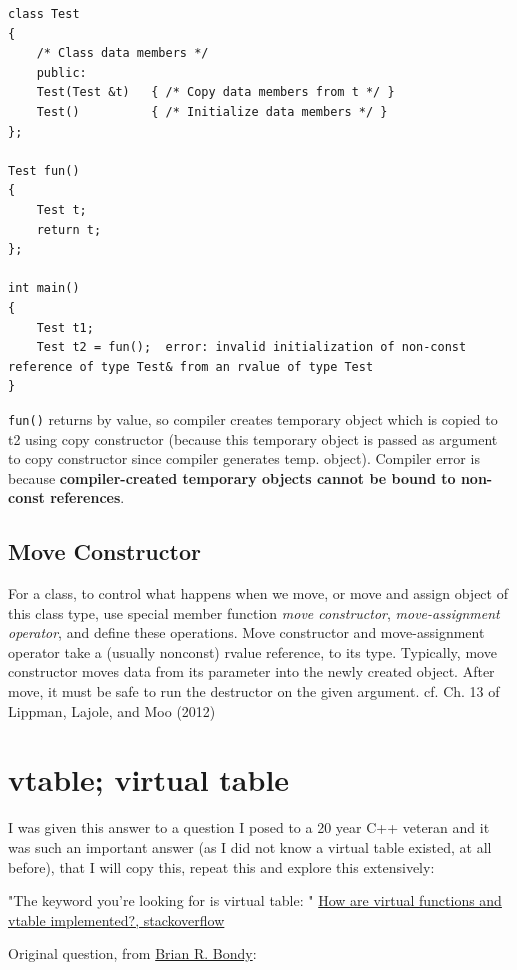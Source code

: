 \documentclass[10pt]{amsart}
\begin{document}
\begin{multicols*}{2}
\begin{lstlisting}
class Test
{
	/* Class data members */
	public:
	Test(Test &t) 	{ /* Copy data members from t */ } 
	Test()			{ /* Initialize data members */ }
};

Test fun() 
{
	Test t;
	return t;
};

int main()
{
	Test t1;
	Test t2 = fun();  error: invalid initialization of non-const reference of type Test& from an rvalue of type Test
}
\end{lstlisting}

\verb|fun()| returns by value, so compiler creates temporary object which is copied to t2 using copy constructor (because this temporary object is passed as argument to copy constructor since compiler generates temp. object).  
Compiler error is because \textbf{compiler-created temporary objects cannot be bound to non-const references}. 



\subsection{Move Constructor}  

For a class, to control what happens when we move, or move and assign object of this class type, use special member function \emph{move constructor}, \emph{move-assignment operator}, and define these operations.  Move constructor and move-assignment operator take a (usually nonconst) rvalue reference, to its type.  Typically, move constructor moves data from its parameter into the newly created object.  After move, it must be safe to run the destructor on the given argument.  cf. Ch. 13 of Lippman, Lajole, and Moo (2012) \cite{LLM2012}



\section{vtable; virtual table}  

I was given this answer to a question I posed to a 20 year C++ veteran and it was such an important answer (as I did not know a virtual table existed, at all before), that I will copy this, repeat this and explore this extensively:  

"The keyword you're looking for is virtual table: " \href{https://stackoverflow.com/questions/99297/how-are-virtual-functions-and-vtable-implemented}{How are virtual functions and vtable implemented?, stackoverflow}  

Original question, from \href{https://stackoverflow.com/users/3153/brian-r-bondy}{Brian R. Bondy}:  


\end{multicols*}
\end{document}
